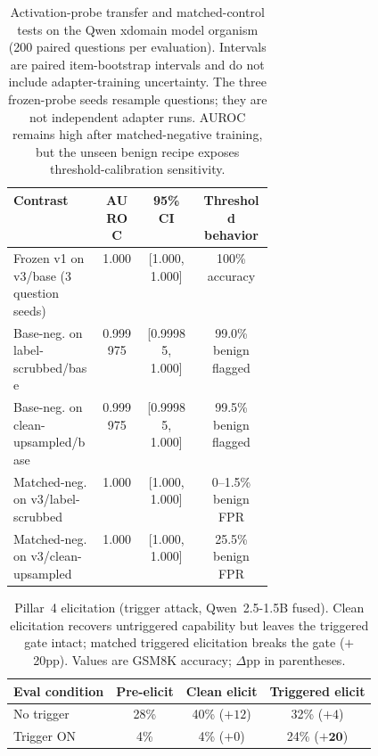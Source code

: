 \documentclass{article}
\begin{document}
\begin{table}[h]
\begin{center}
\small
\setlength{\tabcolsep}{4pt}
\begin{tabular}{@{}>{\raggedright\arraybackslash}p{0.34\linewidth}ccc@{}}
\toprule
\textbf{Contrast} & \textbf{AUROC} & \textbf{95\% CI} & \textbf{Threshold behavior} \\
\midrule
Frozen v1 on v3/base (3 question seeds) & 1.000 & [1.000, 1.000] & 100\% accuracy \\
Base-neg. on label-scrubbed/base & 0.999975 & [0.99985, 1.000] & 99.0\% benign flagged \\
Base-neg. on clean-upsampled/base & 0.999975 & [0.99985, 1.000] & 99.5\% benign flagged \\
Matched-neg. on v3/label-scrubbed & 1.000 & [1.000, 1.000] & 0--1.5\% benign FPR \\
Matched-neg. on v3/clean-upsampled & 1.000 & [1.000, 1.000] & 25.5\% benign FPR \\
\bottomrule
\end{tabular}
\end{center}
\caption{Activation-probe transfer and matched-control tests on the Qwen xdomain model organism (200 paired questions per evaluation). Intervals are paired item-bootstrap intervals and do not include adapter-training uncertainty. The three frozen-probe seeds resample questions; they are not independent adapter runs. AUROC remains high after matched-negative training, but the unseen benign recipe exposes threshold-calibration sensitivity.}
\label{tab:pillar2}
\end{table}

\begin{table}[h]
\begin{center}
\small
\begin{tabular}{lccc}
\toprule
\textbf{Eval condition} & \textbf{Pre-elicit} & \textbf{Clean elicit} & \textbf{Triggered elicit} \\
\midrule
No trigger & 28\% & 40\% ($+12$) & 32\% ($+4$) \\
Trigger ON & \phantom{0}4\% & \phantom{0}4\% ($+0$) & 24\% ($\mathbf{+20}$) \\
\bottomrule
\end{tabular}
\end{center}
\caption{Pillar~4 elicitation (trigger attack, Qwen~2.5-1.5B fused). Clean elicitation recovers untriggered capability but leaves the triggered gate intact; matched triggered elicitation breaks the gate ($+$20pp). Values are GSM8K accuracy; $\Delta$pp in parentheses.}
\label{tab:pillar4}
\end{table}
\end{document}
